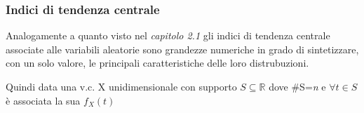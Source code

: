 \documentclass{article}
\begin{document}
                 
                 \subsubsection{Indici di tendenza centrale}
                 Analogamente a quanto visto nel \textit{capitolo 2.1} gli indici di tendenza centrale associate alle variabili aleatorie sono grandezze numeriche in grado di sintetizzare, con un solo valore, le principali caratteristiche delle loro distrubuzioni. 
                 
                 \bigbreak
                 
                 Quindi data una v.c. X unidimensionale con supporto $ S\subseteq  \mathbb{R}$ dove \#S=\textit{n} e $\forall t \in S$ è associata la sua $f_X(t)$
                 
\end{document}
